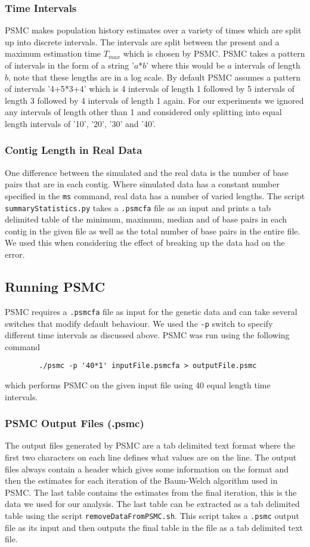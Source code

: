 \documentclass[]{article}
\begin{document}
\subsubsection{Time Intervals}
PSMC makes population history estimates over a variety of times which are split up into discrete intervals. The intervals are split between the present and a maximum estimation time $T_{max}$ which is chosen by PSMC. PSMC takes a pattern of intervals in the form of a string '$a$*$b$' where this would be $a$ intervals of length $b$, note that these lengths are in a log scale. By default PSMC assumes a pattern of intervals '4+5*3+4' which is 4 intervals of length 1 followed by 5 intervals of length 3 followed by 4 intervals of length 1 again. For our experiments we ignored any intervals of length other than 1 and considered only splitting into equal length intervals of '10', '20', '30' and '40'.

\subsubsection{Contig Length in Real Data}
One difference between the simulated and the real data is the number of base pairs that are in each contig. Where simulated data has a constant number specified in the \verb|ms| command, real data has a number of varied lengths. The script \verb|summaryStatistics.py| takes a \verb|.psmcfa| file as an input and prints a tab delimited table of the minimum, maximum, median and of base pairs in each contig in the given file as well as the total number of base pairs in the entire file. We used this when considering the effect of breaking up the data had on the error.

\subsection{Running PSMC}
PSMC requires a \verb|.psmcfa| file as input for the genetic data and can take several switches that modify default behaviour. We used the \verb|-p| switch to specify different time intervals as discussed above. PSMC was run using the following command
\begin{verbatim}
		./psmc -p '40*1' inputFile.psmcfa > outputFile.psmc
\end{verbatim}
which performs PSMC on the given input file using 40 equal length time intervals.

\subsubsection{PSMC Output Files (.psmc)}
The output files generated by PSMC are a tab delimited text format where the first two characters on each line defines what values are on the line. The output files always contain a header which gives some information on the format and then the estimates for each iteration of the Baum-Welch algorithm used in PSMC. The last table contains the estimates from the final iteration, this is the data we used for our analysis. The last table can be extracted as a tab delimited table using the script \verb|removeDataFromPSMC.sh|. This script takes a \verb|.psmc| output file as its input and then outputs the final table in the file as a tab delimited text file.
\end{document}
